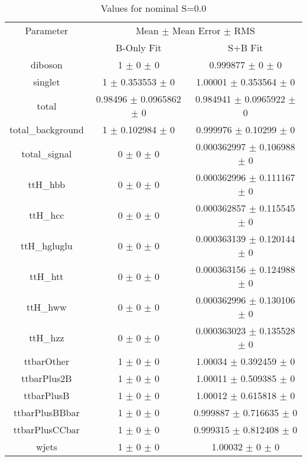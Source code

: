 \begin{table}
\centering
\caption{Values for nominal S=0.0}
\begin{tabular}{ccc}
\toprule
Parameter & \multicolumn{2}{c}{Mean $\pm$ Mean Error $\pm$ RMS}\\
 & B-Only Fit & S+B Fit\\
\midrule
diboson & \num{1} $\pm$ \num{0} $\pm$ \num{0} & \num{0.999877} $\pm$ \num{0} $\pm$ \num{0}\\
singlet & \num{1} $\pm$ \num{0.353553} $\pm$ \num{0} & \num{1.00001} $\pm$ \num{0.353564} $\pm$ \num{0}\\
total & \num{0.98496} $\pm$ \num{0.0965862} $\pm$ \num{0} & \num{0.984941} $\pm$ \num{0.0965922} $\pm$ \num{0}\\
total\_background & \num{1} $\pm$ \num{0.102984} $\pm$ \num{0} & \num{0.999976} $\pm$ \num{0.10299} $\pm$ \num{0}\\
total\_signal & \num{0} $\pm$ \num{0} $\pm$ \num{0} & \num{0.000362997} $\pm$ \num{0.106988} $\pm$ \num{0}\\
ttH\_hbb & \num{0} $\pm$ \num{0} $\pm$ \num{0} & \num{0.000362996} $\pm$ \num{0.111167} $\pm$ \num{0}\\
ttH\_hcc & \num{0} $\pm$ \num{0} $\pm$ \num{0} & \num{0.000362857} $\pm$ \num{0.115545} $\pm$ \num{0}\\
ttH\_hgluglu & \num{0} $\pm$ \num{0} $\pm$ \num{0} & \num{0.000363139} $\pm$ \num{0.120144} $\pm$ \num{0}\\
ttH\_htt & \num{0} $\pm$ \num{0} $\pm$ \num{0} & \num{0.000363156} $\pm$ \num{0.124988} $\pm$ \num{0}\\
ttH\_hww & \num{0} $\pm$ \num{0} $\pm$ \num{0} & \num{0.000362996} $\pm$ \num{0.130106} $\pm$ \num{0}\\
ttH\_hzz & \num{0} $\pm$ \num{0} $\pm$ \num{0} & \num{0.000363023} $\pm$ \num{0.135528} $\pm$ \num{0}\\
ttbarOther & \num{1} $\pm$ \num{0} $\pm$ \num{0} & \num{1.00034} $\pm$ \num{0.392459} $\pm$ \num{0}\\
ttbarPlus2B & \num{1} $\pm$ \num{0} $\pm$ \num{0} & \num{1.00011} $\pm$ \num{0.509385} $\pm$ \num{0}\\
ttbarPlusB & \num{1} $\pm$ \num{0} $\pm$ \num{0} & \num{1.00012} $\pm$ \num{0.615818} $\pm$ \num{0}\\
ttbarPlusBBbar & \num{1} $\pm$ \num{0} $\pm$ \num{0} & \num{0.999887} $\pm$ \num{0.716635} $\pm$ \num{0}\\
ttbarPlusCCbar & \num{1} $\pm$ \num{0} $\pm$ \num{0} & \num{0.999315} $\pm$ \num{0.812408} $\pm$ \num{0}\\
wjets & \num{1} $\pm$ \num{0} $\pm$ \num{0} & \num{1.00032} $\pm$ \num{0} $\pm$ \num{0}\\
\bottomrule
\end{tabular}
\end{table}